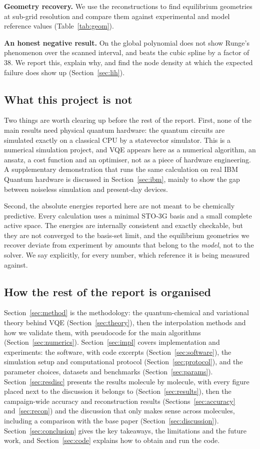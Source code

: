 \documentclass[sigconf,screen,nonacm]{acmart}
\begin{document}
\textbf{Geometry recovery.} We use the reconstructions to find equilibrium
geometries at sub-grid resolution and compare them against experimental and
model reference values (Table~\ref{tab:geom}).

\textbf{An honest negative result.} On  the global polynomial does
not show Runge's phenomenon over the scanned interval, and beats the cubic
spline by a factor of $38$. We report this, explain why, and find the node
density at which the expected failure does show up
(Section~\ref{sec:lih}).

\subsection{What this project is not}

Two things are worth clearing up before the rest of the report. First, none
of the main results need physical quantum hardware: the quantum circuits are simulated exactly on a classical CPU by a statevector simulator. This is
a numerical simulation project, and VQE appears here as a numerical
algorithm, an ansatz, a cost function and an optimiser, not as a piece of
hardware engineering. A supplementary demonstration that runs the same
calculation on real IBM Quantum hardware is discussed in
Section~\ref{sec:ibm}, mainly to show the gap between noiseless simulation
and present-day devices.

Second, the absolute energies reported here are not meant to be chemically
predictive. Every calculation uses a minimal STO-3G basis and a small
complete active space. The energies are internally consistent and exactly
checkable, but they are not converged to the basis-set limit, and the
equilibrium geometries we recover deviate from experiment by amounts that
belong to the \emph{model}, not to the solver. We say explicitly, for every
number, which reference it is being measured against.

\subsection{How the rest of the report is organised}

Section~\ref{sec:method} is the methodology: the quantum-chemical and
variational theory behind VQE (Section~\ref{sec:theory}), then the
interpolation methods and how we validate them, with pseudocode for the main
algorithms (Section~\ref{sec:numerics}). Section~\ref{sec:impl} covers
implementation and experiments: the software, with code excerpts
(Section~\ref{sec:software}), the simulation setup and computational protocol
(Section~\ref{sec:protocol}), and the parameter choices, datasets and
benchmarks (Section~\ref{sec:params}). Section~\ref{sec:resdisc} presents the
results molecule by molecule, with every figure placed next to the discussion
it belongs to (Section~\ref{sec:results}), then the campaign-wide accuracy and
reconstruction results (Sections~\ref{sec:accuracy} and~\ref{sec:recon}) and
the discussion that only makes sense across molecules, including a comparison
with the base paper (Section~\ref{sec:discussion}).
Section~\ref{sec:conclusion} gives the key takeaways, the limitations and the
future work, and Section~\ref{sec:code} explains how to obtain and run the
code.
\end{document}
